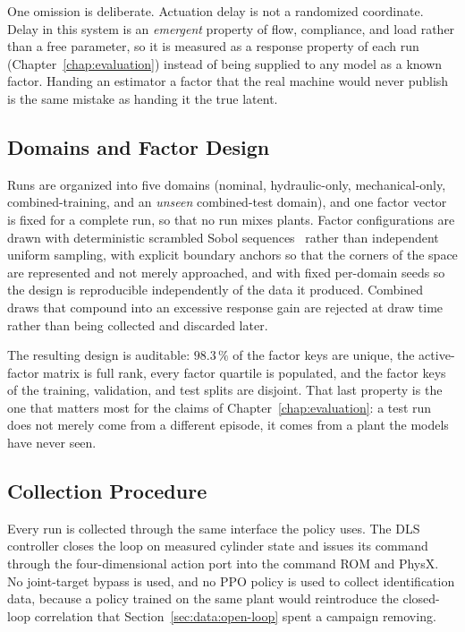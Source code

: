 One omission is deliberate. Actuation delay is not a
randomized coordinate. Delay in this system is an \emph{emergent}
property of flow, compliance, and load rather than a free parameter, so
it is measured as a response property of each run
(Chapter~\ref{chap:evaluation}) instead of being supplied to any model
as a known factor. Handing an estimator a factor that the real machine
would never publish is the same mistake as handing it the true latent.

\subsection{Domains and Factor Design}
\label{sec:data:domains}

Runs are organized into five domains
(nominal, hydraulic-only, mechanical-only, combined-training, and an
\emph{unseen} combined-test domain), and one factor vector is fixed for a complete run, so that no
run mixes plants. Factor configurations are drawn with deterministic
scrambled Sobol sequences~\cite{sobol1967distribution} rather than
independent uniform sampling, with explicit boundary anchors so that the
corners of the space are represented and not merely approached, and with
fixed per-domain seeds so the design is reproducible independently of
the data it produced. Combined draws that compound into an excessive
response gain are rejected at draw time rather than being collected and
discarded later.

The resulting design is auditable: $98.3\,\%$ of the factor keys are
unique, the active-factor matrix is full rank, every factor quartile is
populated, and the factor keys of the training, validation, and test
splits are disjoint. That last property is the one that matters most for
the claims of Chapter~\ref{chap:evaluation}: a test run does not merely
come from a different episode, it comes from a plant the models have
never seen.

\subsection{Collection Procedure}

Every run is collected through the same interface the policy uses. The
DLS controller closes the loop on measured cylinder state and issues its
command through the four-dimensional action port into the command ROM
and PhysX. No joint-target bypass is used, and no PPO policy is used to
collect identification data, because a policy trained on the same plant
would reintroduce the closed-loop correlation that
Section~\ref{sec:data:open-loop} spent a campaign removing.

